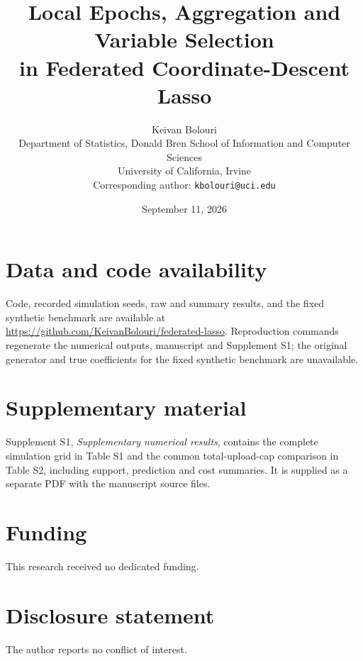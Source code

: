\documentclass[11pt]{article}
\title{\bfseries Local Epochs, Aggregation and Variable Selection\\
in Federated Coordinate-Descent Lasso}
\author{Keivan Bolouri\\[2pt]
\small Department of Statistics, Donald Bren School of Information and Computer Sciences\\
\small University of California, Irvine\\
\small Corresponding author: \texttt{kbolouri@uci.edu}}
\date{September 11, 2026}
\theoremstyle{definition}
\begin{document}
\maketitle













\section*{Data and code availability}
Code, recorded simulation seeds, raw and summary results, and the fixed
synthetic benchmark are available at
\url{https://github.com/KeivanBolouri/federated-lasso}.
Reproduction commands regenerate the numerical outputs, manuscript and
Supplement S1; the original generator and true coefficients for the fixed
synthetic benchmark are unavailable.

\section*{Supplementary material}
Supplement S1, \emph{Supplementary numerical results}, contains the complete
simulation grid in Table S1 and the common total-upload-cap comparison in
Table S2, including support, prediction and cost summaries.
It is supplied as a separate PDF with the manuscript source files.

\section*{Funding}
This research received no dedicated funding.

\section*{Disclosure statement}
The author reports no conflict of interest.



\clearpage
\appendix

\end{document}

